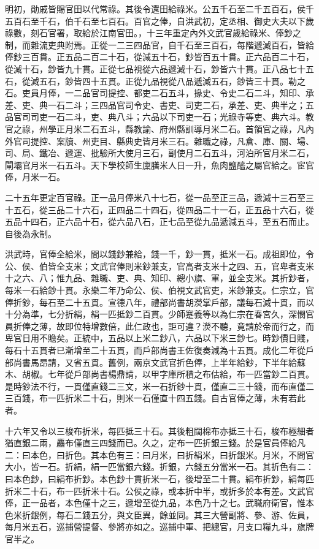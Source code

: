 明初，勛戚皆賜官田以代常祿。其後令還田給祿米。公五千石至二千五百石，侯千五百石至千石，伯千石至七百石。百官之俸，自洪武初，定丞相、御史大夫以下歲祿數，刻石官署，取給於江南官田。，十三年重定內外文武官歲給祿米、俸鈔之制，而雜流吏典附焉。正從一二三四品官，自千石至三百石，每階遞減百石，皆給俸鈔三百貫。正五品二百二十石，從減五十石，鈔皆百五十貫。正六品百二十石，從減十石，鈔皆九十貫。正從七品視從六品遞減十石，鈔皆六十貫。正八品七十五石，從減五石，鈔皆四十五貫。正從九品視從八品遞減五石，鈔皆三十貫。勒之石。吏員月俸，一二品官司提控、都吏二石五斗，掾史、令史二石二斗，知印、承差、吏、典一石二斗；三四品官司令史、書吏、司吏二石，承差、吏、典半之；五品官司司吏一石二斗，吏、典八斗；六品以下司吏一石；光祿寺等吏、典六斗。教官之祿，州學正月米二石五斗，縣教諭、府州縣訓導月米二石。首領官之祿，凡內外官司提控、案牘、州吏目、縣典史皆月米三石。雜職之祿，凡倉、庫、關、場、司、局、鐵冶、遞運、批驗所大使月三石，副使月二石五斗，河泊所官月米二石，閘壩官月米一石五斗。天下學校師生廩膳米人日一升，魚肉鹽醯之屬官給之。宦官俸，月米一石。

二十五年更定百官祿。正一品月俸米八十七石，從一品至正三品，遞減十三石至三十五石，從三品二十六石，正四品二十四石，從四品二十一石，正五品十六石，從五品十四石，正六品十石，從六品八石，正七品至從九品遞減五斗，至五石而止。自後為永制。

洪武時，官俸全給米，間以錢鈔兼給，錢一千，鈔一貫，抵米一石。成祖即位，令公、侯、伯皆全支米；文武官俸則米鈔兼支，官高者支米十之四、五，官卑者支米十之六、八；惟九品、雜職、吏、典、知印、總小旗、軍，並全支米。其折鈔者，每米一石給鈔十貫。永樂二年乃命公、侯、伯視文武官吏，米鈔兼支。仁宗立，官俸折鈔，每石至二十五貫。宣德八年，禮部尚書胡濙掌戶部，議每石減十貫，而以十分為準，七分折絹，絹一匹抵鈔二百貫。少師蹇義等以為仁宗在春宮久，深憫官員折俸之薄，故即位特增數倍，此仁政也，詎可違？濙不聽，竟請於帝而行之，而卑官日用不贍矣。正統中，五品以上米二鈔八，六品以下米三鈔七。時鈔價日賤，每石十五貫者已漸增至二十五貫，而戶部尚書王佐復奏減為十五貫。成化二年從戶部尚書馬昂請，又省五貫。舊例，兩京文武官折色俸，上半年給鈔，下半年給蘇木、胡椒。七年從戶部尚書楊鼎請，以甲字庫所積之布估給，布一匹當鈔二百貫。是時鈔法不行，一貫僅直錢二三文，米一石折鈔十貫，僅直二三十錢，而布直僅二三百錢，布一匹折米二十石，則米一石僅直十四五錢。自古官俸之薄，未有若此者。

十六年又令以三梭布折米，每匹抵三十石。其後粗闊棉布亦抵三十石，梭布極細者猶直銀二兩，麤布僅直三四錢而已。久之，定布一匹折銀三錢。於是官員俸給凡二：曰本色，曰折色。其本色有三：曰月米，曰折絹米，曰折銀米。月米，不問官大小，皆一石。折絹，絹一匹當銀六錢。折銀，六錢五分當米一石。其折色有二：曰本色鈔，曰絹布折鈔。本色鈔十貫折米一石，後增至二十貫。絹布折鈔，絹每匹折米二十石，布一匹折米十石。公侯之祿，或本折中半，或折多於本有差。文武官俸，正一品者，本色僅十之三，遞增至從九品，本色乃十之七。武職府衛官，惟本色米折銀例，每石二錢五分，與文臣異，餘並同。其三大營副將、參、游、佐員，每月米五石，巡捕營提督、參將亦如之。巡捕中軍、把總官，月支口糧九斗，旗牌官半之。

